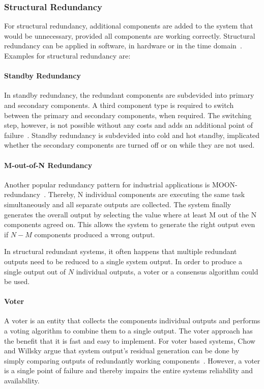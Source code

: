\subsubsection{Structural Redundancy}
For structural redundancy, additional components are added to the system that would be unnecessary, provided all components are working correctly.
Structural redundancy can be applied in software, in hardware or in the time domain~\cite{GeffroyMotetDependableComputing}.
Examples for structural redundancy are:

\paragraph{Standby Redundancy}
In standby redundancy, the redundant components are subdevided into primary and secondary components.
A third component type is required to switch between the primary and secondary components, when required.
The switching step, however, is not possible without any costs and adds an additional point of failure~\cite{PepperlFuchs}.
Standby redundancy is subdevided into cold and hot standby, implicated whether the secondary components are turned off or on while they are not used.

\paragraph{M-out-of-N Redundancy}
Another popular redundancy pattern for industrial applications is \gls*{MOON}-redundancy~\cite{GamerIncreasingMOON}.
Thereby, N individual components are executing the same task simultaneously and all separate outputs are collected.
The system finally generates the overall output by selecting the value where at least M out of the N components agreed on.
This allows the system to generate the right output even if $N-M$ components produced a wrong output.




In structural redundant systems, it often happens that multiple redundant outputs need to be reduced to a single system output.
In order to produce a single output out of $N$ individual outputs, a voter or a consensus algorithm could be used.

\paragraph{Voter} 
A voter is an entity that collects the components individual outputs and performs a voting algorithm to combine them to a single output.
The voter approach has the benefit that it is fast and easy to implement.
For voter based systems, Chow and Willsky argue that system output's residual generation can be done by simply comparing outputs of redundantly working components~\cite{ChowFailureDetectionSystems}.
However, a voter is a single point of failure and thereby impairs the entire systems reliability and availability.

